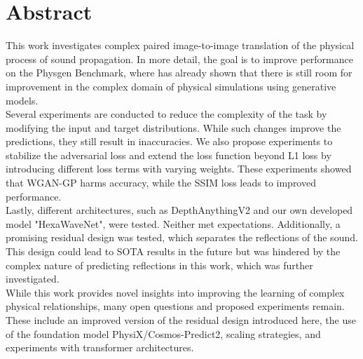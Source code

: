 \chapter*{Abstract}
\label{cha:abstract}
	This work investigates complex paired image-to-image translation of the physical process of sound propagation. In more detail, the goal is to improve performance on the Physgen Benchmark, where \citeauthor{martin_spitznagel_physicsgen_2025} has already shown that there is still room for improvement in the complex domain of physical simulations using generative models.\\
	Several experiments are conducted to reduce the complexity of the task by modifying the input and target distributions. While such changes improve the predictions, they still result in inaccuracies. We also propose experiments to stabilize the adversarial loss and extend the loss function beyond L1 loss by introducing different loss terms with varying weights. These experiments showed that WGAN-GP harms accuracy, while the SSIM loss leads to improved performance.\\
	Lastly, different architectures, such as DepthAnythingV2 and our own developed model "HexaWaveNet", were tested. Neither met expectations. Additionally, a promising residual design was tested, which separates the reflections of the sound. This design could lead to SOTA results in the future but was hindered by the complex nature of predicting reflections in this work, which was further investigated.\\
	While this work provides novel insights into improving the learning of complex physical relationships, many open questions and proposed experiments remain. These include an improved version of the residual design introduced here, the use of the foundation model PhysiX/Cosmos-Predict2, scaling strategies, and experiments with transformer architectures.
	